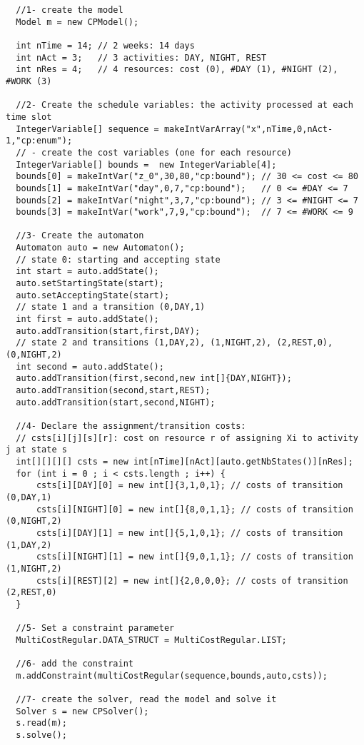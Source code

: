 \begin{lstlisting}
  //1- create the model
  Model m = new CPModel();

  int nTime = 14; // 2 weeks: 14 days
  int nAct = 3;   // 3 activities: DAY, NIGHT, REST
  int nRes = 4;   // 4 resources: cost (0), #DAY (1), #NIGHT (2), #WORK (3)

  //2- Create the schedule variables: the activity processed at each time slot
  IntegerVariable[] sequence = makeIntVarArray("x",nTime,0,nAct-1,"cp:enum");
  // - create the cost variables (one for each resource)
  IntegerVariable[] bounds =  new IntegerVariable[4];
  bounds[0] = makeIntVar("z_0",30,80,"cp:bound"); // 30 <= cost <= 80
  bounds[1] = makeIntVar("day",0,7,"cp:bound");   // 0 <= #DAY <= 7
  bounds[2] = makeIntVar("night",3,7,"cp:bound"); // 3 <= #NIGHT <= 7
  bounds[3] = makeIntVar("work",7,9,"cp:bound");  // 7 <= #WORK <= 9

  //3- Create the automaton
  Automaton auto = new Automaton();
  // state 0: starting and accepting state
  int start = auto.addState();
  auto.setStartingState(start); 
  auto.setAcceptingState(start);
  // state 1 and a transition (0,DAY,1)
  int first = auto.addState();
  auto.addTransition(start,first,DAY);
  // state 2 and transitions (1,DAY,2), (1,NIGHT,2), (2,REST,0), (0,NIGHT,2)
  int second = auto.addState();
  auto.addTransition(first,second,new int[]{DAY,NIGHT});
  auto.addTransition(second,start,REST);
  auto.addTransition(start,second,NIGHT);

  //4- Declare the assignment/transition costs:
  // csts[i][j][s][r]: cost on resource r of assigning Xi to activity j at state s
  int[][][][] csts = new int[nTime][nAct][auto.getNbStates()][nRes];
  for (int i = 0 ; i < csts.length ; i++) {
      csts[i][DAY][0] = new int[]{3,1,0,1}; // costs of transition (0,DAY,1)
      csts[i][NIGHT][0] = new int[]{8,0,1,1}; // costs of transition (0,NIGHT,2)
      csts[i][DAY][1] = new int[]{5,1,0,1}; // costs of transition (1,DAY,2)
      csts[i][NIGHT][1] = new int[]{9,0,1,1}; // costs of transition (1,NIGHT,2)
      csts[i][REST][2] = new int[]{2,0,0,0}; // costs of transition (2,REST,0)
  }

  //5- Set a constraint parameter
  MultiCostRegular.DATA_STRUCT = MultiCostRegular.LIST;

  //6- add the constraint
  m.addConstraint(multiCostRegular(sequence,bounds,auto,csts));	
  
  //7- create the solver, read the model and solve it
  Solver s = new CPSolver();
  s.read(m);
  s.solve();
\end{lstlisting}
